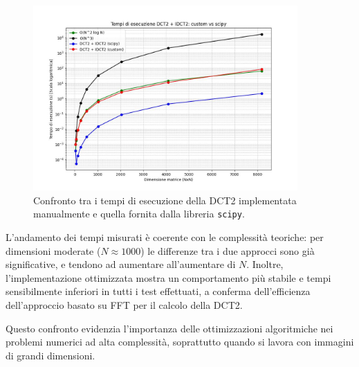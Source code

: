 \begin{figure}[H]
    \centering
    \includegraphics[width=0.9\textwidth]{images/benchmark.jpeg}
    \caption{Confronto tra i tempi di esecuzione della DCT2 implementata manualmente e quella fornita dalla libreria \texttt{scipy}.}
    \label{fig:benchmark}
\end{figure}

L’andamento dei tempi misurati è coerente con le complessità teoriche: per dimensioni moderate (\( N \approx 1000 \)) le differenze tra i due approcci sono già significative, e tendono ad aumentare all’aumentare di \( N \). Inoltre, l’implementazione ottimizzata mostra un comportamento più stabile e tempi sensibilmente inferiori in tutti i test effettuati, a conferma dell’efficienza dell’approccio basato su FFT per il calcolo della DCT2.

Questo confronto evidenzia l’importanza delle ottimizzazioni algoritmiche nei problemi numerici ad alta complessità, soprattutto quando si lavora con immagini di grandi dimensioni.

